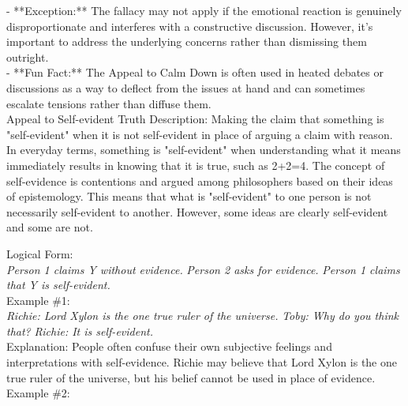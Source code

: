 \documentclass[a4paper,12pt,single,pdftex]{scrbook}
\begin{document}
    
      - **Exception:** The fallacy may not apply if the emotional reaction is genuinely disproportionate and interferes with a constructive discussion. However, it's important to address the underlying concerns rather than dismissing them outright.
    \\

    
      - **Fun Fact:** The Appeal to Calm Down is often used in heated debates or discussions as a way to deflect from the issues at hand and can sometimes escalate tensions rather than diffuse them.
    \\

  

Appeal to Self-evident Truth
    Description: Making the claim that something is "self-evident" when it is not self-evident in place of arguing a claim with reason. In everyday terms, something is "self-evident" when understanding what it means immediately results in knowing that it is true, such as 2+2=4. The concept of self-evidence is contentions and argued among philosophers based on their ideas of epistemology. This means that what is "self-evident" to one person is not necessarily self-evident to another. However, some ideas are clearly self-evident and some are not.

    
      Logical Form:
    \\

    
      {\em Person 1 claims Y without evidence.} \newline
{\em Person 2 asks for evidence.} \newline
{\em Person 1 claims that Y is self-evident.}
    \\

    
      Example \#1:
    \\

    
      {\em Richie: Lord Xylon is the one true ruler of the universe.} \newline
{\em Toby: Why do you think that?} \newline
{\em Richie: It is self-evident.}
    \\

    
      Explanation: People often confuse their own subjective feelings and interpretations with self-evidence. Richie may believe that Lord Xylon is the one true ruler of the universe, but his belief cannot be used in place of evidence.
    \\

    
      Example \#2:
    \\
\end{document}
